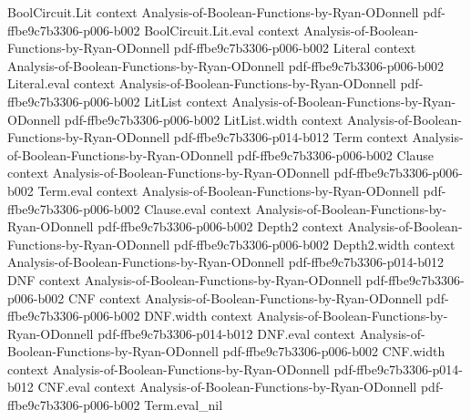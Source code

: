 \begin{lemma}
\leanok
{}
\proofstep
  {BoolCircuit.Lit}
  {context}
  {Analysis-of-Boolean-Functions-by-Ryan-ODonnell}
  {pdf-ffbe9c7b3306-p006-b002}
\proofstep
  {BoolCircuit.Lit.eval}
  {context}
  {Analysis-of-Boolean-Functions-by-Ryan-ODonnell}
  {pdf-ffbe9c7b3306-p006-b002}
\proofstep
  {Literal}
  {context}
  {Analysis-of-Boolean-Functions-by-Ryan-ODonnell}
  {pdf-ffbe9c7b3306-p006-b002}
\proofstep
  {Literal.eval}
  {context}
  {Analysis-of-Boolean-Functions-by-Ryan-ODonnell}
  {pdf-ffbe9c7b3306-p006-b002}
\proofstep
  {LitList}
  {context}
  {Analysis-of-Boolean-Functions-by-Ryan-ODonnell}
  {pdf-ffbe9c7b3306-p006-b002}
\proofstep
  {LitList.width}
  {context}
  {Analysis-of-Boolean-Functions-by-Ryan-ODonnell}
  {pdf-ffbe9c7b3306-p014-b012}
\proofstep
  {Term}
  {context}
  {Analysis-of-Boolean-Functions-by-Ryan-ODonnell}
  {pdf-ffbe9c7b3306-p006-b002}
\proofstep
  {Clause}
  {context}
  {Analysis-of-Boolean-Functions-by-Ryan-ODonnell}
  {pdf-ffbe9c7b3306-p006-b002}
\proofstep
  {Term.eval}
  {context}
  {Analysis-of-Boolean-Functions-by-Ryan-ODonnell}
  {pdf-ffbe9c7b3306-p006-b002}
\proofstep
  {Clause.eval}
  {context}
  {Analysis-of-Boolean-Functions-by-Ryan-ODonnell}
  {pdf-ffbe9c7b3306-p006-b002}
\proofstep
  {Depth2}
  {context}
  {Analysis-of-Boolean-Functions-by-Ryan-ODonnell}
  {pdf-ffbe9c7b3306-p006-b002}
\proofstep
  {Depth2.width}
  {context}
  {Analysis-of-Boolean-Functions-by-Ryan-ODonnell}
  {pdf-ffbe9c7b3306-p014-b012}
\proofstep
  {DNF}
  {context}
  {Analysis-of-Boolean-Functions-by-Ryan-ODonnell}
  {pdf-ffbe9c7b3306-p006-b002}
\proofstep
  {CNF}
  {context}
  {Analysis-of-Boolean-Functions-by-Ryan-ODonnell}
  {pdf-ffbe9c7b3306-p006-b002}
\proofstep
  {DNF.width}
  {context}
  {Analysis-of-Boolean-Functions-by-Ryan-ODonnell}
  {pdf-ffbe9c7b3306-p014-b012}
\proofstep
  {DNF.eval}
  {context}
  {Analysis-of-Boolean-Functions-by-Ryan-ODonnell}
  {pdf-ffbe9c7b3306-p006-b002}
\proofstep
  {CNF.width}
  {context}
  {Analysis-of-Boolean-Functions-by-Ryan-ODonnell}
  {pdf-ffbe9c7b3306-p014-b012}
\proofstep
  {CNF.eval}
  {context}
  {Analysis-of-Boolean-Functions-by-Ryan-ODonnell}
  {pdf-ffbe9c7b3306-p006-b002}
\proofstep
  {Term.eval_nil}

\end{lemma}
